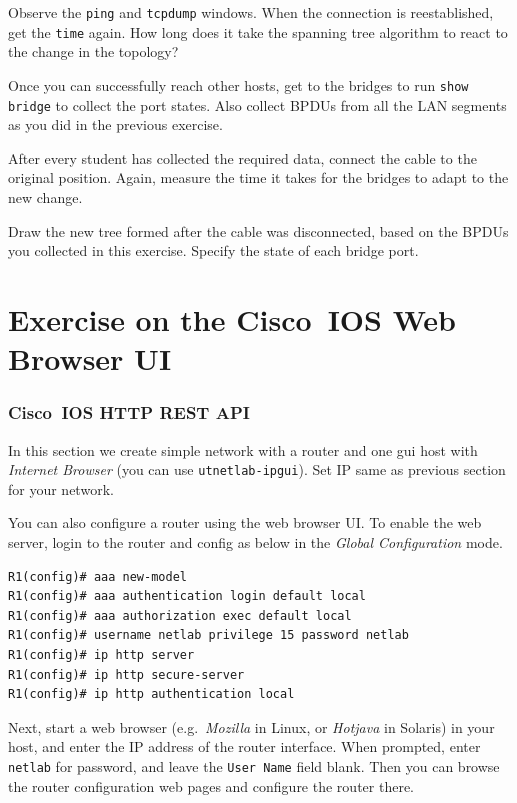 \documentclass{../UTNetLab}
\begin{document}
    Observe the \lstinline{ping} and \lstinline{tcpdump} windows. When the connection is reestablished, get the \lstinline{time} again. How long does it take the spanning tree algorithm to react to the change in the topology?

    Once you can successfully reach other hosts, get to the bridges to run \lstinline[language={cisco}]{show bridge} to collect the port states. Also collect BPDUs from all the LAN segments as you did in the previous exercise.

    After every student has collected the required data, connect the cable to the original position. Again, measure the time it takes for the bridges to adapt to the new change.
    
    \begin{report}
    \item Draw the new tree formed after the cable was disconnected, based on the BPDUs you collected in this exercise. Specify the state of each bridge port.
    \end{report}

\part{Exercise on the Cisco~IOS Web Browser UI}
\section{Cisco~IOS HTTP REST API}
    In this section we create simple network with a router and one gui host with \textit{Internet Browser} (you can use \texttt{utnetlab-ipgui}). Set IP same as previous section for your network.

    You can also configure a router using the web browser UI. To enable the web server, login to the router and config as below  in the \textit{Global Configuration} mode. 

    \begin{lstlisting}[language={cisco}]
R1(config)# aaa new-model
R1(config)# aaa authentication login default local
R1(config)# aaa authorization exec default local
R1(config)# username netlab privilege 15 password netlab
R1(config)# ip http server
R1(config)# ip http secure-server
R1(config)# ip http authentication local
    \end{lstlisting}
    
    Next, start a web browser (e.g.\ \textit{Mozilla} in Linux, or \textit{Hotjava} in Solaris) in your host, and enter the IP address of the router interface. When prompted, enter \texttt{netlab} for password, and leave the \texttt{User Name} field blank. Then you can browse the router configuration web pages and configure the router there.
\end{document}

